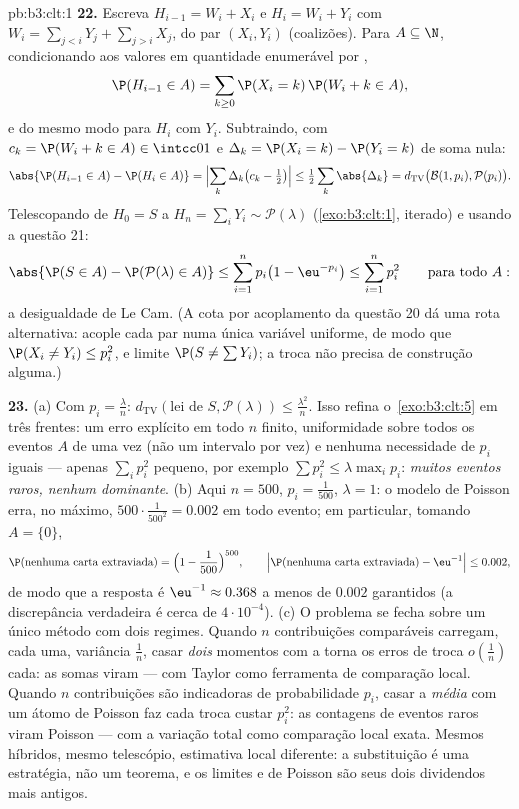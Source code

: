 \begin{solution}{pb:b3:clt:1}
\textbf{22.} Escreva $H_{i-1} = W_i + X_i$ e $H_i = W_i +
Y_i$ com $W_i = \sum_{j<i}Y_j + \sum_{j>i}X_j$,
 do par $(X_i, Y_i)$ (coalizões). Para $A
\subseteq \N$, condicionando aos valores em quantidade enumerável
por ,
\[
\P(H_{i-1} \in A) = \sum_{k\geq0}\P(X_i = k)\,\P(W_i + k
\in A),
\]
e do mesmo modo para $H_i$ com $Y_i$. Subtraindo, com $c_k
= \P(W_i + k \in A) \in \intcc01$ e $\Delta_k = \P(X_i =
k) - \P(Y_i = k)$ de soma nula:
\[
\abs{\P(H_{i-1} \in A) - \P(H_i \in A)} =
\Bigl|\sum_k\Delta_k\bigl(c_k - \tfrac12\bigr)\Bigr| \leq
\tfrac12\sum_k\abs{\Delta_k} =
d_{\mathrm{TV}}\bigl(\mathcal B(1, p_i), \mathcal
P(p_i)\bigr) .
\]
Telescopando de $H_0 = S$ a $H_n = \sum_iY_i \sim
\mathcal P(\lambda)$ (\cref{exo:b3:clt:1}, iterado) e
usando a questão 21:
\[
\abs{\P(S \in A) - \P(\mathcal P(\lambda) \in A)} \leq
\sum_{i=1}^np_i\bigl(1 - \eu^{-p_i}\bigr) \leq
\sum_{i=1}^np_i^2
\qquad\text{para todo } A :
\]
a desigualdade de Le Cam. (A cota por acoplamento da questão 20 dá uma
rota alternativa: acople cada par numa única variável
uniforme, de modo que $\P(X_i \neq Y_i) \leq p_i^2$, e limite
$\P(S \neq \sum Y_i)$; a troca não precisa de construção
alguma.)

\textbf{23.} (a) Com $p_i = \frac\lambda n$:
$d_{\mathrm{TV}}(\text{lei de }S, \mathcal P(\lambda))
\leq \frac{\lambda^2}n$. Isso refina
o~\cref{exo:b3:clt:5} em três frentes: um erro explícito em
todo $n$ finito, uniformidade sobre todos os eventos $A$ de uma vez
(não um intervalo por vez) e nenhuma necessidade de
$p_i$ iguais --- apenas $\sum_ip_i^2$ pequeno, por exemplo $\sum p_i^2 \leq
\lambda\max_ip_i$: \emph{muitos eventos raros, nenhum
dominante}. (b) Aqui $n = 500$, $p_i = \frac1{500}$,
$\lambda = 1$: o modelo de Poisson erra, no máximo,
$500\cdot\frac1{500^2} = 0.002$ em todo evento; em
particular, tomando $A = \{0\}$,
\[
\P(\text{nenhuma carta extraviada}) = \Bigl(1 -
\frac1{500}\Bigr)^{500},
\qquad
\Bigl|\P(\text{nenhuma carta extraviada}) - \eu^{-1}\Bigr| \leq
0.002,
\]
de modo que a resposta é $\eu^{-1} \approx 0.368$ a menos de
$0.002$ garantidos (a discrepância verdadeira é cerca de
$4\cdot10^{-4}$). (c) O problema se fecha sobre um único método com dois regimes. Quando $n$
contribuições comparáveis carregam, cada uma, variância
$\frac1n$, casar \emph{dois} momentos com a
 torna os erros de troca $o(\frac1n)$ cada: as somas viram
 --- com Taylor como ferramenta de comparação local.
Quando $n$ contribuições são indicadoras de probabilidade
$p_i$, casar a \emph{média} com um átomo de Poisson
faz cada troca custar $p_i^2$: as contagens de eventos raros viram
Poisson --- com a variação total como comparação local
exata. Mesmos híbridos, mesmo telescópio, estimativa local
diferente: a substituição é uma estratégia, não um teorema, e
os limites  e de Poisson são seus dois dividendos
mais antigos.


\end{solution}
